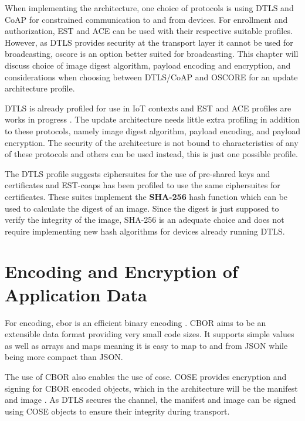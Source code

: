 \documentclass[0-thesis.tex]{subfiles}
\begin{document}
\label{chap:profiles}
When implementing the architecture, one choice of protocols is using DTLS and CoAP for
constrained communication to and from devices. For enrollment and authorization, EST and
ACE can be used with their respective suitable profiles. However, as DTLS provides
security at the transport layer it cannot be used for broadcasting, \gls{oscore} is an
option better suited for broadcasting. This chapter will discuss choice of image digest
algorithm, payload encoding and encryption, and considerations when choosing between
DTLS/CoAP and OSCORE for an update architecture profile.

DTLS is already profiled for use in IoT contexts and EST and ACE profiles are works in
progress \parencite{rfc7925, est-coaps, ace-dtls-profile}. The update architecture needs
little extra profiling in addition to these protocols, namely image digest algorithm,
payload encoding, and payload encryption. The security of the architecture is not bound to
characteristics of any of these protocols and others can be used instead, this is just one
possible profile.

The DTLS profile suggests ciphersuites for the use of pre-shared keys and certificates and
EST-coaps has been profiled to use the same ciphersuites for certificates. These suites
implement the \textbf{SHA-256} hash function which can be used to calculate the digest of
an image. Since the digest is just supposed to verify the integrity of the image, SHA-256
is an adequate choice and does not require implementing new hash algorithms for devices
already running DTLS.

\section{Encoding and Encryption of Application Data}
\label{sec:encoding-encryption}
For encoding, \gls{cbor} is an efficient binary encoding \parencite{rfc7049}. CBOR aims to
be an extensible data format providing very small code sizes. It supports simple values as
well as arrays and maps meaning it is easy to map to and from JSON while being more
compact than JSON. 

The use of CBOR also enables the use of \gls{cose}. COSE provides encryption and signing
for CBOR encoded objects, which in the architecture will be the manifest and image
\parencite{rfc8152}. As DTLS secures the channel, the manifest and image can be signed
using COSE objects to ensure their integrity during transport. 
\end{document}
